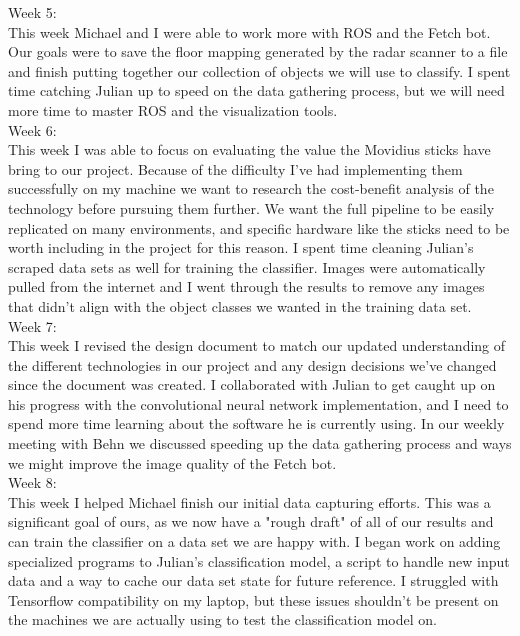 \documentclass[draftclsnofoot, onecolumn, 10pt, compsoc]{IEEEtran}
\begin{document}
    	Week 5: \\ \indent This week Michael and I were able to work more with ROS and the Fetch bot. Our goals were to save the floor mapping generated by the radar scanner to a file and finish putting together our collection of objects we will use to classify. I spent time catching Julian up to speed on the data gathering process, but we will need more time to master ROS and the visualization tools. \\
    	Week 6: \\ \indent This week I was able to focus on evaluating the value the Movidius sticks have bring to our project. Because of the difficulty I've had implementing them successfully on my machine we want to research the cost-benefit analysis  of the technology before pursuing them further. We want the full pipeline to be easily replicated on many environments, and specific hardware like the sticks need to be worth including in the project for this reason. I spent time cleaning Julian's scraped data sets as well for training the classifier. Images were automatically pulled from the internet and I went through the results to remove any images that didn't align with the object classes we wanted in the training data set. \\
    	Week 7: \\ \indent This week I revised the design document to match our updated understanding of the different technologies in our project and any design decisions we've changed since the document was created. I collaborated with Julian to get caught up on his progress with the convolutional neural network implementation, and I need to spend more time learning about the software he is currently using. In our weekly meeting with Behn we discussed speeding up the data gathering process and ways we might improve the image quality of the Fetch bot. \\
    	Week 8: \\ \indent This week I helped Michael finish our initial data capturing efforts. This was a significant goal of ours, as we now have a "rough draft" of all of our results and can train the classifier on a data set we are happy with. I began work on adding specialized programs to Julian's classification model, a script to handle new input data and a way to cache our data set state for future reference. I struggled with Tensorflow compatibility on my laptop, but these issues shouldn’t be present on the machines we are actually using to test the classification model on. \\
\end{document}

